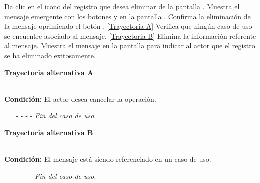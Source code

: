 	\begin{UCtrayectoria}
		\UCpaso[\UCactor] Da clic en el icono \eliminar del registro que desea eliminar de la pantalla .
		\UCpaso[\UCsist] Muestra el mensaje emergente  con los botones  y  en la pantalla .
		\UCpaso[\UCactor] Confirma la eliminación de la mensaje oprimiendo el botón . \hyperlink{CU9-3:TAA}{[Trayectoria A]}
		\UCpaso[\UCsist] Verifica que ningún caso de uso se encuentre asociado al mensaje. \hyperlink{CU9-3:TAB}{[Trayectoria B]}
		\UCpaso[\UCsist] Elimina la información referente al mensaje.
		\UCpaso[\UCsist] Muestra el mensaje  en la pantalla  para indicar al actor que el registro se ha eliminado exitosamente.
	\end{UCtrayectoria}

\hypertarget{CU9-3:TAA}{\textbf{Trayectoria alternativa A}}\\
\noindent \textbf{Condición:} El actor desea cancelar la operación.
\begin{enumerate}
	\UCpaso[\UCactor] Oprime el botón  de la pantalla emergente.
	\UCpaso[\UCsist] Muestra la pantalla .
	\item[- -] - - {\em {Fin del caso de uso}}.%
\end{enumerate}
\hypertarget{CU9-3:TAB}{\textbf{Trayectoria alternativa B}}\\
\noindent \textbf{Condición:} El mensaje está siendo referenciado en un caso de uso.
\begin{enumerate}
	\UCpaso[\UCsist] Muestra el mensaje  en la pantalla .
	\item[- -] - - {\em {Fin del caso de uso}}.%
\end{enumerate}	

